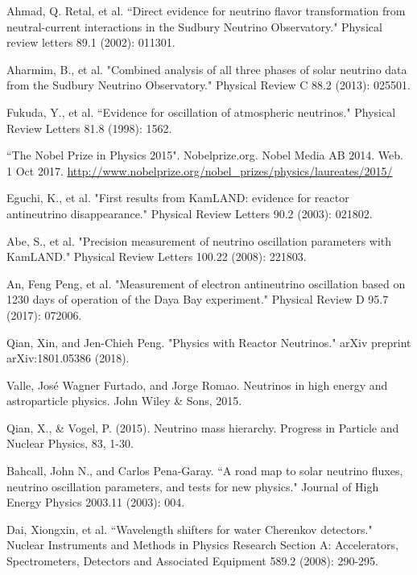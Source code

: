 \documentclass[preprint,12pt]{elsarticle}
\begin{document}
\begin{thebibliography}{00}
 Ahmad, Q. Retal, et al. ``Direct evidence for neutrino flavor transformation from neutral-current interactions in the Sudbury Neutrino Observatory." Physical review letters 89.1 (2002): 011301.

 Aharmim, B., et al. "Combined analysis of all three phases of solar neutrino data from the Sudbury Neutrino Observatory." Physical Review C 88.2 (2013): 025501.

 Fukuda, Y., et al. ``Evidence for oscillation of atmospheric neutrinos." Physical Review Letters 81.8 (1998): 1562.

 ``The Nobel Prize in Physics 2015". Nobelprize.org. Nobel Media AB 2014. Web. 1 Oct 2017. \url{http://www.nobelprize.org/nobel_prizes/physics/laureates/2015/}

 Eguchi, K., et al. "First results from KamLAND: evidence for reactor antineutrino disappearance." Physical Review Letters 90.2 (2003): 021802.

 Abe, S., et al. "Precision measurement of neutrino oscillation parameters with KamLAND." Physical Review Letters 100.22 (2008): 221803.


 An, Feng Peng, et al. "Measurement of electron antineutrino oscillation based on 1230 days of operation of the Daya Bay experiment." Physical Review D 95.7 (2017): 072006.

 Qian, Xin, and Jen-Chieh Peng. "Physics with Reactor Neutrinos." arXiv preprint arXiv:1801.05386 (2018).


 Valle, José Wagner Furtado, and Jorge Romao. Neutrinos in high energy and astroparticle physics. John Wiley \& Sons, 2015.




 Qian, X., \& Vogel, P. (2015). Neutrino mass hierarchy. Progress in Particle and Nuclear Physics, 83, 1-30.



 Bahcall, John N., and Carlos Pena-Garay. ``A road map to solar neutrino fluxes, neutrino oscillation parameters, and tests for new physics." Journal of High Energy Physics 2003.11 (2003): 004.






 Dai, Xiongxin, et al. ``Wavelength shifters for water Cherenkov detectors." Nuclear Instruments and Methods in Physics Research Section A: Accelerators, Spectrometers, Detectors and Associated Equipment 589.2 (2008): 290-295.


\end{thebibliography}
\end{document}
